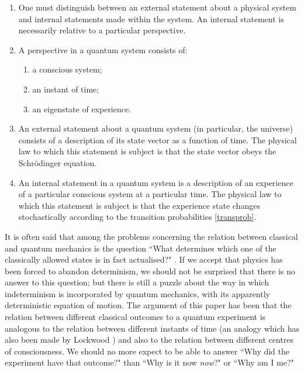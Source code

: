 \documentclass[12pt,a4paper,reqno]{article}
\renewcommand{\(}{\left(}
\renewcommand{\)}{\right)}
\newcommand{\<}{\langle}
\renewcommand{\>}{\rangle}
\theoremstyle{plain} %
\theoremstyle{definition}
\theoremstyle{remark}
\begin{document}
\begin{enumerate}

\item One must distinguish between an external statement about a
physical system and internal statements made within the system. An internal
statement is necessarily relative to a particular perspective.

\item A perspective in a quantum system consists of:
\begin{enumerate}
\item a conscious system;
\item an instant of time;
\item an eigenstate of experience.
\end{enumerate}

\item An external statement about a quantum system (in particular, the
universe) consists of a description of its state vector as a function of
time. The physical law to which this statement is subject is that the
state vector obeys the Schr\"odinger equation.

\item An internal statement in a quantum system is a description of an
experience of a particular conscious system at a particular time. The
physical law to which this statement is subject is that the experience
state changes stochastically according to the transition probabilities
\eqref{transprob}.

\end{enumerate}

It is often said that among the problems concerning the relation between
classical and quantum mechanics is the question ``What determines which
one of the classically allowed states is in fact actualised?"
\cite{Clarke}. If we accept that physics has been forced to abandon 
determinism, we should not be
surprised that there is no answer to this question; but there is still a
puzzle about the way in which indeterminism is incorporated by quantum
mechanics, with its apparently deterministic equation of motion. The
argument of this paper has been that the relation between different
classical outcomes to a quantum experiment is analogous to the relation
between different instants of time (an analogy which has also been made
by Lockwood \cite{Lockwood:manyminds}) and also to the relation between
different centres of consciousness. We should no more expect to be able
to answer ``Why did the experiment have that outcome?" than ``Why is it
now {\em now}?" \cite{Lockwood:book} or ``Why am I me?"
\end{document}
